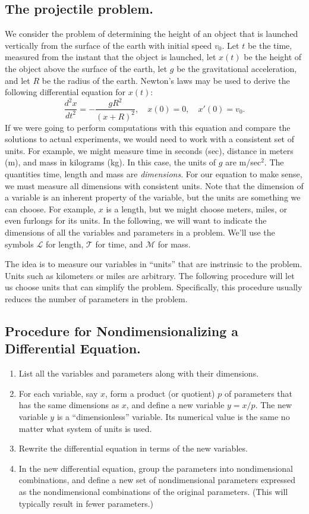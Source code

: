\documentclass[reqno]{immbook}
\numberwithin{equation}{chapter}
\numberwithin{question}{section}
\numberwithin{theorem}{chapter}
\numberwithin{figure}{chapter}
\theoremstyle{definition}
\begin{document}
\subsection*{The projectile problem.}
We consider the problem of determining the height of an object that is
launched vertically from the surface of the earth with initial speed $v_0$.
Let $t$ be the time, measured from the instant that the
object is launched, let $x(t)$ be the height of the object above
the surface of the earth, let $g$ be the gravitational acceleration,
and let $R$ be the radius of the earth.
Newton's laws may be used to derive the following differential equation
for $x(t)$:
\begin{equation}
   \frac{d^2x}{dt^2} = -\frac{gR^2}{(x+R)^2}, \quad x(0)=0, \quad x'(0)=v_0.
   \label{eqn:projectile}
\end{equation}
If we were going to perform computations with this equation and compare
the solutions to actual experiments, we would need to work with
a consistent set of units.  For example, we might measure time in
seconds (sec), distance in meters (m), and mass in kilograms (kg).
In this case, the units of $g$ are  m/sec$^2$.
The quantities time, length and mass are \emph{dimensions}.
For our equation to make sense, we must measure all dimensions
with consistent units.  Note that the dimension of a variable
is an inherent property of the variable, but the units are something
we can choose. For example, $x$ is a length, but we might
choose meters, miles, or even furlongs for its units.
In the following, we will want to indicate the dimensions
of all the variables and parameters in a problem.
We'll use the symbols $\mathcal{L}$ for length,
$\mathcal{T}$ for time, and $\mathcal{M}$ for mass.

The idea is to measure our variables in ``units''
that are instrinsic to the problem.  Units such as kilometers
or miles are arbitrary. The following procedure
will let us choose units that can simplify the problem.
Specifically, this procedure usually reduces the number
of parameters in the problem.

\subsection*{Procedure for Nondimensionalizing a Differential Equation.}
\begin{enumerate}
\item List all the variables and parameters along with
their dimensions.
\item For each variable, say $x$, form a product
(or quotient) $p$ of parameters that has the same
dimensions as $x$, and define a new variable
$y = x/p$. The new variable $y$ is a ``dimensionless'' variable.
Its numerical value is the same no matter what
system of units is used.
\item Rewrite the differential equation in terms
of the new variables.
\item In the new differential equation, group the parameters
into nondimensional combinations, and define a new set of
nondimensional parameters expressed as the nondimensional
combinations of the original parameters.
(This will typically result in fewer parameters.)
\end{enumerate}
\end{document}
